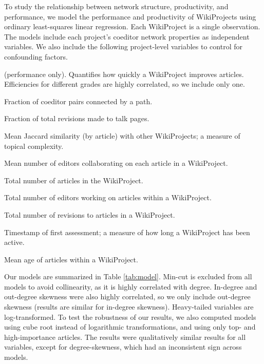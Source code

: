 To study the relationship between network structure, productivity, and performance,
we model the performance and productivity of WikiProjects using ordinary least-squares linear regression.
Each WikiProject is a single observation.
The models include each project's coeditor network properties as independent variables.
We also include the following project-level variables to control for confounding factors.
\begin{description}
\setlength\itemsep{0pt}
\item[C-productivity]
(performance only).
Quantifies how quickly a WikiProject improves articles.
Efficiencies for different grades are highly correlated,
so we include only one.
\item[Connected fraction.]
Fraction of coeditor pairs connected by a path.
\item[Talk fraction.] Fraction of total revisions made to talk pages.
\item[Mean similarity.] Mean Jaccard similarity (by article) with other WikiProjects; a measure of topical complexity.
\item[Mean editors/article.] Mean number of editors collaborating on each article in a WikiProject.
\item[Article count.] Total number of articles in the WikiProject.
\item[Editor count.] Total number of editors working on articles within a WikiProject.
\item[Revision count.] Total number of revisions to articles in a WikiProject.
\item[First assessment.] Timestamp of first assessment; a measure of how long a WikiProject has been active.
\item[Mean article age.] Mean age of articles within a WikiProject.
\end{description}

Our models are summarized in Table \ref{tab:model}.
Min-cut is excluded from all models to avoid collinearity,
as it is highly correlated with degree.
In-degree and out-degree skewness were also highly correlated,
so we only include out-degree skewness
(results are similar for in-degree skewness).
Heavy-tailed variables are log-transformed.
To test the robustness of our results,
we also computed models using cube root instead of logarithmic transformations,
and using only top- and high-importance articles.
The results were qualitatively similar results for all variables,
except for degree-skewness, which had an inconsistent sign across models.

